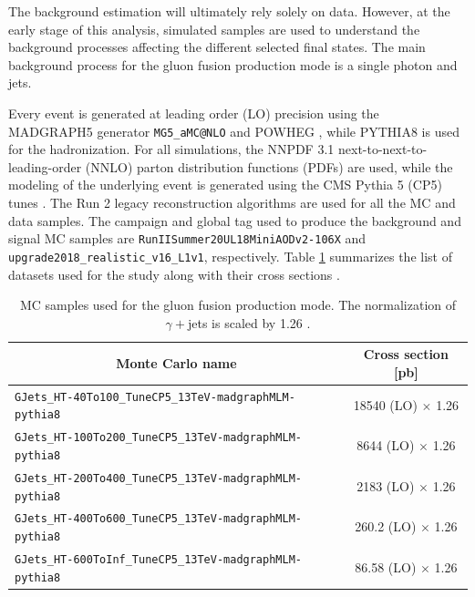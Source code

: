The background estimation will ultimately rely solely on data. However, at the early stage of this analysis, simulated samples are used to understand the background processes affecting the different selected final states. The main background process for the gluon fusion production mode is a single photon and jets.

Every event is generated at leading order (LO) precision using the MADGRAPH5 generator \verb+MG5_aMC@NLO+ \cite{Alwall:2014hca} and POWHEG \cite{Alioli:2010xd}, while PYTHIA8 \cite{Sjostrand:2014zea} is used for the hadronization. For all simulations, the NNPDF 3.1 \cite{NNPDF:2017mvq} next-to-next-to-leading-order (NNLO) parton distribution functions (PDFs) are used, while the modeling of the underlying event is generated using the CMS Pythia 5 (CP5) tunes \cite{CMS:2019csb}. The Run 2 legacy reconstruction algorithms \cite{Elmetenawee:2020emw} are used for all the MC and data samples. The campaign and global tag used to produce the background and signal MC samples are \verb+RunIISummer20UL18MiniAODv2-106X+ and \verb+upgrade2018_realistic_v16_L1v1+, respectively. Table \ref{tab:MC_samples} summarizes the list of datasets used for the study along with their cross sections \cite{CERN:xsdb}.

\begin{table}[ht]
    \centering
    \begin{tabular}{|l|c|}
        \hline
        \multicolumn{1}{|c|}{\cellcolor{lightgray}Monte Carlo name} & \cellcolor{lightgray}Cross section [pb] \\ \hline
        \verb+GJets_HT-40To100_TuneCP5_13TeV-madgraphMLM-pythia8+  & 18540 (LO) $\times$ 1.26 \\
        \verb+GJets_HT-100To200_TuneCP5_13TeV-madgraphMLM-pythia8+  & 8644 (LO) $\times$ 1.26 \\
        \verb+GJets_HT-200To400_TuneCP5_13TeV-madgraphMLM-pythia8+  & 2183 (LO) $\times$ 1.26 \\
        \verb+GJets_HT-400To600_TuneCP5_13TeV-madgraphMLM-pythia8+  & 260.2 (LO) $\times$ 1.26 \\
        \verb+GJets_HT-600ToInf_TuneCP5_13TeV-madgraphMLM-pythia8+  & 86.58 (LO) $\times$ 1.26 \\ \hline
    \end{tabular}
    \caption{MC samples used for the gluon fusion production mode. The normalization of $\gamma+$jets is scaled by 1.26 \cite{CMS:2018qao} .}
    \label{tab:MC_samples}
\end{table}

